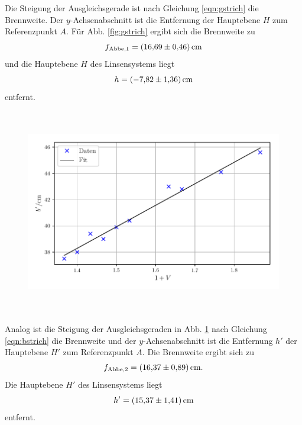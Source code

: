 \noindent Die Steigung der Ausgleichsgerade ist nach Gleichung \eqref{eqn:gstrich} die Brennweite.
Der $y$-Achsenabschnitt ist die Entfernung der Hauptebene $H$ zum Referenzpunkt $A$.
Für Abb. \ref{fig:gstrich} ergibt sich die Brennweite zu 
\begin{equation*}
    f_\text{Abbe,1} = \SI{16.69 \pm 0.46}{\centi\meter}
\end{equation*}
und die Hauptebene $H$ des Linsensystems liegt
\begin{equation*}
    h = \SI{-7.82 \pm 1.36}{\centi\meter}
\end{equation*}
entfernt.

\begin{figure}
    \centering
    \includegraphics[width=14cm, height=9cm]{build/abbe_b.pdf}
    \caption{}
    \label{fig:bstrich}
\end{figure}

\noindent Analog ist die Steigung der Ausgleichsgeraden in Abb. \ref{fig:bstrich} nach Gleichung \eqref{eqn:bstrich} die Brennweite und der $y$-Achsenabschnitt ist die Entfernung $h'$ der Hauptebene $H'$ zum Referenzpunkt $A$.
Die Brennweite ergibt sich zu 
\begin{equation*}
    f_\text{Abbe,2} = \SI{16.37 \pm 0.89}{\centi\meter}.
\end{equation*}
Die Hauptebene $H'$ des Linsensystems liegt
\begin{equation*}
    h' = \SI{15.37 \pm 1.41}{\centi\meter}
\end{equation*}
entfernt.